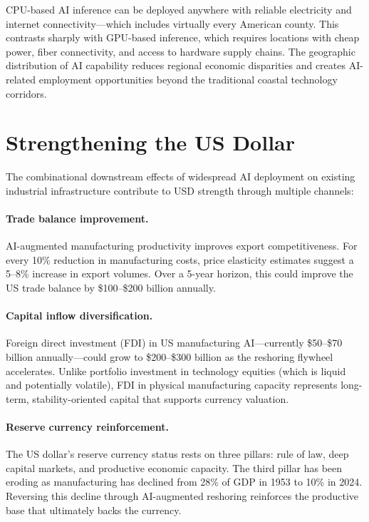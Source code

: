 \documentclass[11pt,a4paper,openright]{book}
\begin{document}
CPU-based AI inference can be deployed anywhere with reliable electricity and internet connectivity---which includes virtually every American county. This contrasts sharply with GPU-based inference, which requires locations with cheap power, fiber connectivity, and access to hardware supply chains. The geographic distribution of AI capability reduces regional economic disparities and creates AI-related employment opportunities beyond the traditional coastal technology corridors.

\section{Strengthening the US Dollar}

The combinational downstream effects of widespread AI deployment on existing industrial infrastructure contribute to USD strength through multiple channels:

\paragraph{Trade balance improvement.}
AI-augmented manufacturing productivity improves export competitiveness. For every 10\% reduction in manufacturing costs, price elasticity estimates suggest a 5--8\% increase in export volumes. Over a 5-year horizon, this could improve the US trade balance by \$100--\$200 billion annually.

\paragraph{Capital inflow diversification.}
Foreign direct investment (FDI) in US manufacturing AI---currently \$50--\$70 billion annually---could grow to \$200--\$300 billion as the reshoring flywheel accelerates. Unlike portfolio investment in technology equities (which is liquid and potentially volatile), FDI in physical manufacturing capacity represents long-term, stability-oriented capital that supports currency valuation.

\paragraph{Reserve currency reinforcement.}
The US dollar's reserve currency status rests on three pillars: rule of law, deep capital markets, and productive economic capacity. The third pillar has been eroding as manufacturing has declined from 28\% of GDP in 1953 to 10\% in 2024. Reversing this decline through AI-augmented reshoring reinforces the productive base that ultimately backs the currency.
\end{document}
